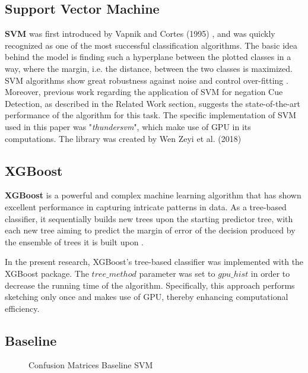 \subsection{Support Vector Machine} 
\textbf{SVM} was first introduced by Vapnik and Cortes (1995) \cite{vapnik1995}, and was quickly recognized as one of the most successful classification algorithms. The basic idea behind the model is finding such a hyperplane between the plotted classes in a way, where the margin, i.e. the distance, between the two classes is maximized. SVM algorithms show great robustness against noise and control over-fitting \cite{robust2009}. Moreover, previous work regarding the application of SVM for negation Cue Detection, as described in the Related Work section, suggests the state-of-the-art performance of the algorithm for this task. The specific implementation of SVM used in this paper was  "\textit{thundersvm}", which make use of GPU in its computations. The library was created by Wen Zeyi et al. (2018) \cite{thundersvm}

\subsection{XGBoost}
\textbf{XGBoost} is a powerful and complex machine learning algorithm that has shown excellent performance in capturing intricate patterns in data. As a tree-based classifier, it sequentially builds new trees upon the starting predictor tree, with each new tree aiming to predict the margin of error of the decision produced by the ensemble of trees it is built upon \cite{minasny2009elements}.

In the present research, XGBoost's tree-based classifier was implemented with the XGBoost package. The $tree\_method$ parameter was set to $gpu\_hist$ in order to decrease the running time of the algorithm. Specifically, this approach performs sketching only once and makes use of GPU, thereby enhancing computational efficiency.

\subsection{Baseline}
\begin{figure}[!ht]
\centering
  \caption{Confusion Matrices Baseline SVM}
  \label{fig:base_line_svm}
\end{figure}

